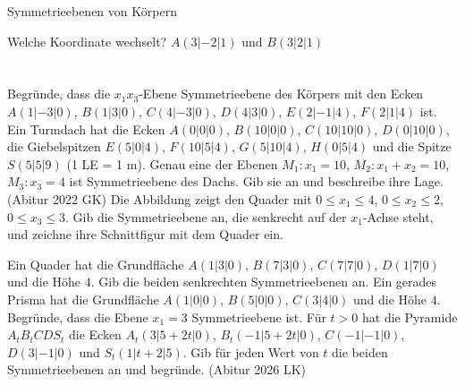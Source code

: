 \setcounter{aufgabe}{14}

\begin{aufgabe}{Symmetrieebenen von Körpern}
\begin{teile}
\teil Welche Koordinate wechselt? $A(3 | -2 | 1)$ und $B(3 | 2 | 1)$ \\  \\  \\ 
\teil Begründe, dass die $x_1x_3$-Ebene Symmetrieebene des Körpers mit den Ecken $A(1 | -3 | 0)$, $B(1 | 3 | 0)$, $C(4 | -3 | 0)$, $D(4 | 3 | 0)$, $E(2 | -1 | 4)$, $F(2 | 1 | 4)$ ist.
\teil Ein Turmdach hat die Ecken $A(0 | 0 | 0)$, $B(10 | 0 | 0)$, $C(10 | 10 | 0)$, $D(0 | 10 | 0)$, die Giebelspitzen $E(5 | 0 | 4)$, $F(10 | 5 | 4)$, $G(5 | 10 | 4)$, $H(0 | 5 | 4)$ und die Spitze $S(5 | 5 | 9)$ (1 LE = 1 m). Genau eine der Ebenen $M_1: x_1 = 10$, $M_2: x_1 + x_2 = 10$, $M_3: x_3 = 4$ ist Symmetrieebene des Dachs. Gib sie an und beschreibe ihre Lage. \hfill (Abitur 2022 GK)
\teil Die Abbildung zeigt den Quader mit $0 \le x_1 \le 4$, $0 \le x_2 \le 2$, $0 \le x_3 \le 3$. Gib die Symmetrieebene an, die senkrecht auf der $x_1$-Achse steht, und zeichne ihre Schnittfigur mit dem Quader ein.

\begin{ksys3}\end{ksys3}
\teil Ein Quader hat die Grundfläche $A(1 | 3 | 0)$, $B(7 | 3 | 0)$, $C(7 | 7 | 0)$, $D(1 | 7 | 0)$ und die Höhe $4$. Gib die beiden senkrechten Symmetrieebenen an.
\teil Ein gerades Prisma hat die Grundfläche $A(1 | 0 | 0)$, $B(5 | 0 | 0)$, $C(3 | 4 | 0)$ und die Höhe $4$. Begründe, dass die Ebene $x_1 = 3$ Symmetrieebene ist.
\teil Für $t > 0$ hat die Pyramide $A_tB_tCDS_t$ die Ecken $A_t(3 | 5 + 2t | 0)$, $B_t(-1 | 5 + 2t | 0)$, $C(-1 | -1 | 0)$, $D(3 | -1 | 0)$ und $S_t(1 | t + 2 | 5)$. Gib für jeden Wert von $t$ die beiden Symmetrieebenen an und begründe. \hfill (Abitur 2026 LK)
\end{teile}
\end{aufgabe}

